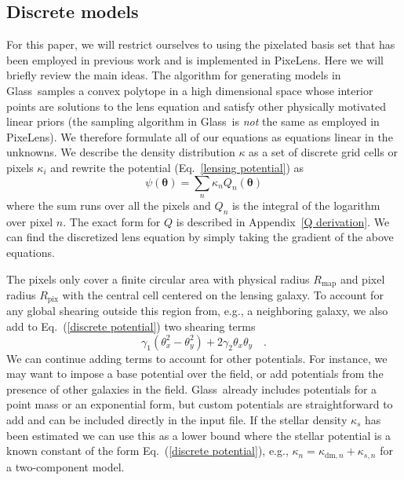 \documentclass[galley,usenatbib]{mn2e}
\newcommand{\Glass}{{\sc Glass}}
\newcommand{\PixeLens}{{\sc PixeLens}}
\newcommand{\Rmap}{\ensuremath{R_\mathrm{map}}}
\newcommand{\Rpix}{\ensuremath{R_\mathrm{pix}}}
\newcommand{\eqnref}[1] {Eq.~(\ref{#1})}
\newcommand{\eqnrefp}[1] {(Eq.~\ref{#1})}
\newcommand{\appref}[1] {Appendix~\ref{#1}}
\renewcommand{\vec}[1]{\ensuremath{\boldsymbol{#1}}}
\begin{document}
\subsection{Discrete models}\label{sec:discrete}
For this paper, we will restrict ourselves to using the pixelated basis set that
has been employed in previous work and is implemented in \PixeLens. Here we
will briefly review the main ideas. The algorithm for generating models in
\Glass\ samples a convex polytope in a high dimensional space whose interior
points are solutions to the lens equation and satisfy other physically
motivated linear priors (the sampling algorithm in \Glass\ is \emph{not} the same as
employed in \PixeLens).  We therefore formulate all of our equations as
equations linear in the unknowns. We describe the density distribution $\kappa$
as a set of discrete grid cells or pixels $\kappa_i$ and rewrite the potential
\eqnrefp{lensing potential} as
%
\begin{equation}
  \psi(\vec\theta) = \sum_n \kappa_n Q_n(\vec\theta)
  \label{discrete potential}
\end{equation}
%
where the sum runs over all the pixels and $Q_n$ is the integral of the logarithm
over pixel $n$. The exact form for $Q$ is described in \appref{Q derivation}.
We can find the discretized lens equation by simply taking the gradient of the
above equations. 

The pixels only cover a finite circular area with physical radius $\Rmap$ and
pixel radius $\Rpix$ with the central cell centered on the lensing galaxy. To account for any global
shearing outside this region from, e.g., a neighboring galaxy, we also add to
\eqnref{discrete potential} two shearing terms
%
\begin{equation}
\label{shear}
\gamma_1(\theta_x^2 - \theta_y^2) + 2\gamma_2\theta_x\theta_y\quad.
\end{equation}
%
We can continue adding terms to account for other potentials. For instance,
we may want to impose a base potential over the field, or add potentials
from the presence of other galaxies in the field. \Glass\
already includes potentials for a point mass or an exponential form, but custom
potentials are straightforward to add and can be included directly in the input file.
If the stellar density $\kappa_s$ has been estimated we can use this as a lower bound
where the stellar potential is a known constant of the form \eqnref{discrete
potential}, e.g., $\kappa_n = \kappa_{\mathrm{dm},n} + \kappa_{s,n}$ for a two-component model.
\end{document}

